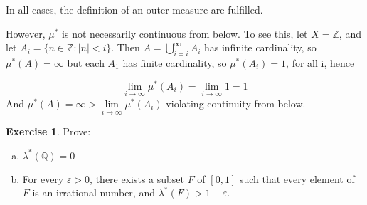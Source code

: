 \documentclass[11pt,oneside]{article}
\numberwithin{equation}{section}
\theoremstyle{definition}
\newtheorem{exercise}{Exercise}
\def\QQ{\mathbb{Q}}
\def\ZZ{\mathbb{Z}}
\begin{document}
\begin{solution}
\begin{enumerate}[(a)]
      In all cases, the definition of an outer measure are fulfilled.
  \end{enumerate}

  However, $\mu ^*$ is not necessarily continuous from below.  To see
  this, let $X = \ZZ$, and let $A_i = \{ n \in \ZZ : |n| < i \}$.
  Then $A = \bigcup \limits _ { i=i } ^ \infty A_i$ has infinite
  cardinality, so $\mu ^* ( A) = \infty$ but each $A_1$ has finite
  cardinality, so $\mu ^*(A_i) = 1$, for all i, hence

  $$ \lim _ { i \to \infty } \mu ^* (A_i) = \lim _ { i \to \infty} 1 = 1
  $$
  And $ \mu^* ( A) = \infty > \lim \limits_{ i \to \infty } \mu ^* (A_i)$ violating
  continuity from below.  
  
\end{solution}

\begin{exercise}
  Prove:
  \begin{enumerate}[(a)]
  \item
    $\lambda ^* ( \QQ ) = 0 $
  \item
    For every $ \varepsilon > 0$, there exists a subset $F$ of $[0,1]$ such that every element of $F$ is an irrational number,
    and $ \lambda ^* ( F) > 1 - \varepsilon $.
    
  \end{enumerate}
\end{exercise}
\end{document}
